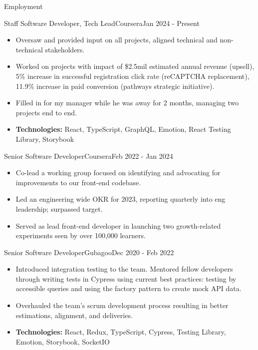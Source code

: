 \documentclass[]{mcdowellcv}
\begin{document}
	\begin{cvsection}{Employment}
		    \begin{cvsubsection}{Staff Software Developer, Tech Lead}{Coursera}{Jan 2024 - Present}
	                \begin{itemize}
	                        \item Oversaw and provided input on all projects, aligned technical and non-technical stakeholders.
	                        \item Worked on projects with impact of \$2.5mil estimated annual revenue (upsell), 5\% increase in successful registration click rate (reCAPTCHA replacement), 11.9\% increase in paid conversion (pathways strategic initiative).
	                        \item Filled in for my manager while he was away for 2 months, managing two projects end to end.
	                        \item \textbf{Technologies:} React, TypeScript, GraphQL, Emotion, React Testing Library, Storybook
	                \end{itemize}
	           
	        \end{cvsubsection}
	        \begin{cvsubsection}{Senior Software Developer}{Coursera}{Feb 2022 - Jan 2024}
	                \begin{itemize}
	                        \item Co-lead a working group focused on identifying and advocating for improvements to our front-end codebase.
	                        \item Led an engineering wide OKR for 2023, reporting quarterly into eng leadership; surpassed target.
	                        \item Served as lead front-end developer in launching two growth-related experiments seen by over 100,000 learners.
	                \end{itemize}
	           
	        \end{cvsubsection}
	        
		\begin{cvsubsection}{Senior Software Developer}{Gubagoo}{Dec 2020 - Feb 2022}
 			\begin{itemize}
 			    \item Introduced integration testing to the team. Mentored fellow developers through writing tests in Cypress using current best practices: testing by accessible queries and using the factory pattern to create mock API data.
				\item Overhauled the team's scrum development process resulting in better estimations, alignment, and deliveries.
				\item \textbf{Technologies:} React, Redux, TypeScript, Cypress, Testing Library, Emotion, Storybook, SocketIO
			\end{itemize}
		\end{cvsubsection}
		

\end{cvsection}
\end{document}
